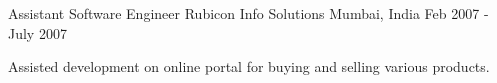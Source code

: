 \begin{cventries}
  \cventry
    {Assistant Software Engineer} %
    {Rubicon Info Solutions} %
    {Mumbai, India} %
    {Feb 2007 - July 2007} %
    {
      \begin{cvitems} %
        \item {Assisted development on online portal for buying and selling various products.}
      \end{cvitems}
    }

\end{cventries}
